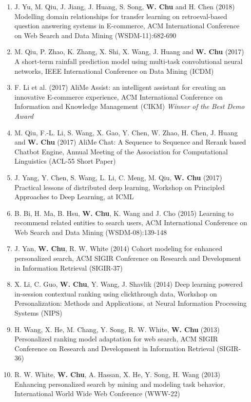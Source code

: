 \documentclass[line,10pt,final]{res}
\begin{document}
\begin{resume}
\begin{enumerate}
\item J. Yu, M. Qiu, J. Jiang, J. Huang, S. Song, {\bf W. Chu} and H. Chen (2018) Modelling domain relationships for transfer learning on retroeval-based question answering systems in E-commerce, ACM International Conference on Web Search and Data Mining (WSDM-11):682-690  
\item M. Qiu, P. Zhao, K. Zhang, X. Shi, X. Wang, J. Huang and {\bf W. Chu} (2017) A short-term rainfall prediction model using multi-task convolutional neural networks, IEEE International Conference on Data Mining (ICDM)  
\item F. Li et al. (2017) AliMe Assist: an intelligent assistant for creating an innovative E-commerce experience, ACM International Conference on Information and Knowledge Management (CIKM) {\em Winner of the Best Demo Award}
\item M. Qiu, F.-L. Li, S. Wang, X. Gao, Y. Chen, W. Zhao, H. Chen, J. Huang and  {\bf W. Chu} (2017) AliMe Chat: A Sequence to Sequence and Rerank based Chatbot Engine, Annual Meeting of the Association for Computational Linguistics (ACL-55 Short Paper)  
\item J. Yang, Y. Chen, S. Wang, L. Li, C. Meng, M. Qiu, {\bf W. Chu} (2017) Practical lessons of distributed deep learning, Workshop on Principled Approaches to Deep Learning, at ICML  
\item B. Bi, H. Ma, B. Hsu,  {\bf W. Chu}, K. Wang and J. Cho (2015) Learning to recommend related entities to search users, ACM International Conference on Web Search and Data Mining (WSDM-08):139-148  
\item J. Yan,  {\bf W. Chu}, R. W. White (2014) Cohort modeling for enhanced personalized search, ACM SIGIR Conference on Research and Development in Information Retrieval (SIGIR-37)  
\item X. Li, C. Guo,  {\bf W. Chu}, Y. Wang, J. Shavlik (2014) Deep learning powered in-session contextual ranking using clickthrough data, Workshop on Personalization: Methods and Applications, at Neural Information Processing Systems (NIPS)  
\item H. Wang, X. He, M. Chang, Y. Song, R. W. White,  {\bf W. Chu} (2013) Personalized ranking model adaptation for web search, ACM SIGIR Conference on Research and Development in Information Retrieval (SIGIR-36)  
\item R. W. White,  {\bf W. Chu}, A. Hassan, X. He, Y. Song, H. Wang (2013) Enhancing personalized search by mining and modeling task behavior, International World Wide Web Conference (WWW-22)  

\end{enumerate}
\end{resume}
\end{document}
